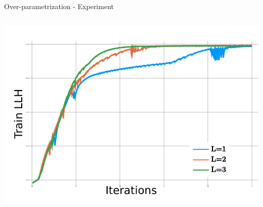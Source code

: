 \begin{frame}{Over-parametrization - Experiment}
\begin{columns}
\begin{column}{\linewidth}
\includegraphics[width=\textwidth]{nltcs_experiment}
\end{column}
\end{columns}
\end{frame}

